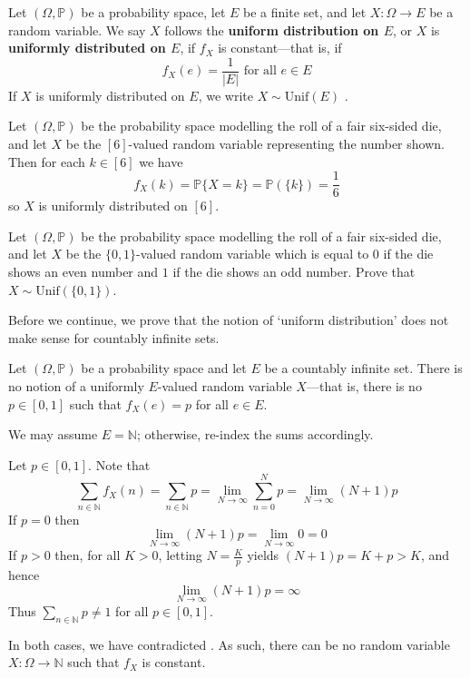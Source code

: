 \begin{definition}
\label{defUniformDistribution}
Let $(\Omega,\mathbb{P})$ be a probability space, let $E$ be a finite set, and let $X : \Omega \to E$ be a random variable. We say $X$ follows the \textbf{uniform distribution on $E$}, or $X$ is \textbf{uniformly distributed on $E$}, if $f_X$ is constant---that is, if
\[ f_X(e)=\frac{1}{|E|} \text{ for all } e \in E \]
If $X$ is uniformly distributed on $E$, we write $X \sim \mathrm{Unif}(E)$ .
\end{definition}

\begin{example}
Let $(\Omega,\mathbb{P})$ be the probability space modelling the roll of a fair six-sided die, and let $X$ be the $[6]$-valued random variable representing the number shown. Then for each $k \in [6]$ we have
\[ f_X(k) = \mathbb{P}\{X=k\} = \mathbb{P}(\{k\}) = \frac{1}{6} \]
so $X$ is uniformly distributed on $[6]$.
\end{example}

\begin{exercise}
Let $(\Omega,\mathbb{P})$ be the probability space modelling the roll of a fair six-sided die, and let $X$ be the $\{0,1\}$-valued random variable which is equal to $0$ if the die shows an even number and $1$ if the die shows an odd number. Prove that $X \sim \mathrm{Unif}(\{0,1\})$.
\end{exercise}

Before we continue, we prove that the notion of `uniform distribution' does not make sense for countably infinite sets. 

\begin{theorem}
Let $(\Omega,\mathbb{P})$ be a probability space and let $E$ be a countably infinite set. There is no notion of a uniformly $E$-valued random variable $X$---that is, there is no $p \in [0,1]$ such that $f_X(e)=p$ for all $e \in E$.
\end{theorem}

\begin{cproof}
We may assume $E=\mathbb{N}$; otherwise, re-index the sums accordingly.

Let $p \in [0,1]$. Note that
\[ \sum_{n \in \mathbb{N}} f_X(n) = \sum_{n \in \mathbb{N}} p = \lim_{N \to \infty} \sum_{n=0}^N p = \lim_{N \to \infty} (N+1)p \]
If $p=0$ then
\[ \lim_{N \to \infty} (N+1)p = \lim_{N \to \infty} 0 = 0 \]
If $p>0$ then, for all $K>0$, letting $N = \frac{K}{p}$ yields $(N+1)p = K+p > K$, and hence
\[ \lim_{N \to \infty} (N+1)p = \infty \]
Thus $\sum_{n \in \mathbb{N}} p \ne 1$ for all $p \in [0,1]$.

In both cases, we have contradicted . As such, there can be no random variable $X : \Omega \to \mathbb{N}$ such that $f_X$ is constant.
\end{cproof}

